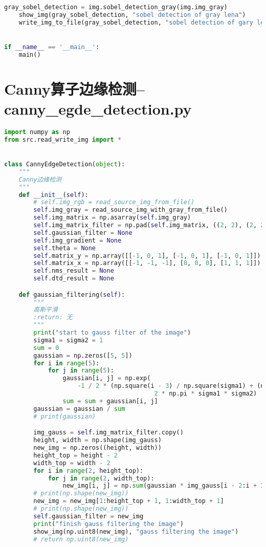 \documentclass{hitreport}
\begin{document}
\begin{appendices}
\begin{lstlisting}[language=python]
    gray_sobel_detection = img.sobel_detection_gray(img.img_gray)
    show_img(gray_sobel_detection, "sobel detection of gray lena")
    write_img_to_file(gray_sobel_detection, "sobel detection of gary lena")


if __name__ == '__main__':
    main()

\end{lstlisting}

\section{Canny算子边缘检测--canny\_egde\_detection.py}\label{app:canny}
\begin{lstlisting}[language=python]
import numpy as np
from src.read_write_img import *


class CannyEdgeDetection(object):
    """
    Canny边缘检测
    """
    def __init__(self):
        # self.img_rgb = read_source_img_from_file()
        self.img_gray = read_source_img_with_gray_from_file()
        self.img_matrix = np.asarray(self.img_gray)
        self.img_matrix_filter = np.pad(self.img_matrix, ((2, 2), (2, 2)), 'constant', constant_values=(0, 0))
        self.gaussian_filter = None
        self.img_gradient = None
        self.theta = None
        self.matrix_y = np.array([[-1, 0, 1], [-1, 0, 1], [-1, 0, 1]])
        self.matrix_x = np.array([[-1, -1, -1], [0, 0, 0], [1, 1, 1]])
        self.nms_result = None
        self.dtd_result = None

    def gaussian_filtering(self):
        """
        高斯平滑
        :return: 无
        """
        print("start to gauss filter of the image")
        sigma1 = sigma2 = 1
        sum = 0
        gaussian = np.zeros([5, 5])
        for i in range(5):
            for j in range(5):
                gaussian[i, j] = np.exp(
                    -1 / 2 * (np.square(i - 3) / np.square(sigma1) + (np.square(j - 3) / np.square(sigma2)))) / (
                                         2 * np.pi * sigma1 * sigma2)
                sum = sum + gaussian[i, j]
        gaussian = gaussian / sum
        # print(gaussian)

        img_gauss = self.img_matrix_filter.copy()
        height, width = np.shape(img_gauss)
        new_img = np.zeros((height, width))
        height_top = height - 2
        width_top = width - 2
        for i in range(2, height_top):
            for j in range(2, width_top):
                new_img[i, j] = np.sum(gaussian * img_gauss[i - 2:i + 3, j - 2:j + 3])
        # print(np.shape(new_img))
        new_img = new_img[1:height_top + 1, 1:width_top + 1]
        # print(np.shape(new_img))
        self.gaussian_filter = new_img
        print("finish gauss filtering the image")
        show_img(np.uint8(new_img), "gauss filtering the image")
        # return np.uint8(new_img)


\end{lstlisting}
\end{appendices}
\end{document}
